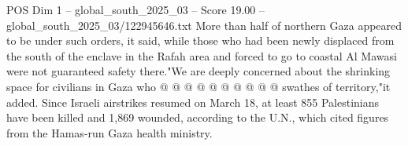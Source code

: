 \begin{textsample}{POS Dim 1 – global\_south\_2025\_03 – Score 19.00 – global\_south\_2025\_03/122945646.txt}
More than half of northern Gaza appeared to be under such orders, it said, while those who had been newly displaced from the south of the enclave in the Rafah area and forced to go to coastal Al Mawasi were not guaranteed safety there."We are deeply concerned about the shrinking space for civilians in Gaza who @ @ @ @ @ @ @ @ @ @ swathes of territory,"it added.
Since Israeli airstrikes resumed on March 18, at least 855 Palestinians have been killed and 1,869 wounded, according to the U.N., which cited figures from the Hamas-run Gaza health ministry.

\end{textsample}
